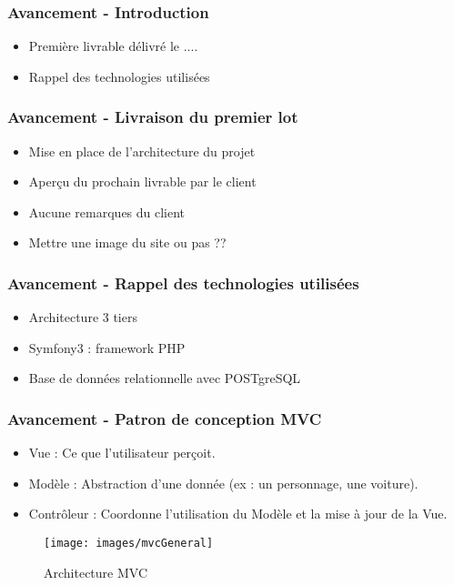 \speaker{\Kafui}

\begin{frame}
  \frametitle{Avancement - Introduction}
  \begin{itemize}
	\item Première livrable délivré le ....
	\item Rappel des technologies utilisées
  \end{itemize}
\end{frame}

\begin{frame}
  \frametitle{Avancement - Livraison du premier lot}
  \begin{itemize}
	\item Mise en place de l'architecture du projet
	\item Aperçu du prochain livrable par le client
	\item Aucune remarques du client
	\item Mettre une image du site ou pas ??
  \end{itemize}
\end{frame}

\begin{frame}
  \frametitle{Avancement - Rappel des technologies utilisées}
  \begin{itemize}
	\item Architecture 3 tiers
	\item Symfony3 : framework PHP 
	\item Base de données relationnelle avec POSTgreSQL
  \end{itemize}
\end{frame}

\begin{frame}
  \frametitle{Avancement - Patron de conception MVC}
  \begin{itemize}
	\item Vue : Ce que l'utilisateur perçoit.
	\item Modèle : Abstraction d'une donnée (ex : un personnage, une voiture).
	\item Contrôleur : Coordonne l'utilisation du Modèle et la mise à jour de la Vue.
  \end{itemize}

\begin{figure}[!h]
	\begin{center}
	\texttt{[image: images/mvcGeneral]}
	\caption{Architecture MVC}
	\end{center}
\end{figure}

\end{frame}

